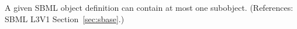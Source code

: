 A given SBML object definition can contain at most one \Notes subobject.
(References: SBML L3V1 Section~\ref{sec:sbase}.)


